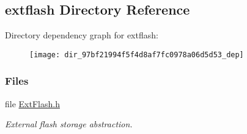 \subsection{extflash Directory Reference}
\label{dir_97bf21994f5f4d8af7fc0978a06d5d53}
Directory dependency graph for extflash\+:
\nopagebreak
\begin{figure}[H]
\begin{center}
\leavevmode
\texttt{[image: dir\_97bf21994f5f4d8af7fc0978a06d5d53\_dep]}
\end{center}
\end{figure}
\subsubsection*{Files}
\begin{DoxyCompactItemize}
\item 
file \hyperlink{_ext_flash_8h}{Ext\+Flash.\+h}
\begin{DoxyCompactList}\small\item\em External flash storage abstraction. \end{DoxyCompactList}\end{DoxyCompactItemize}
